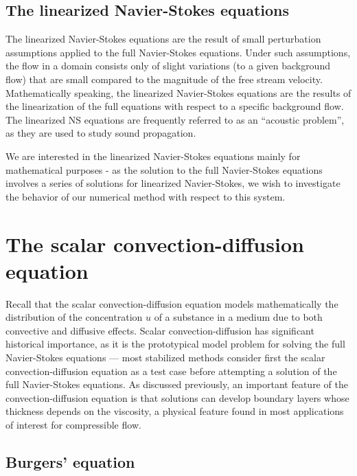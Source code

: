 \subsection{The linearized Navier-Stokes equations}

The linearized Navier-Stokes equations are the result of small perturbation assumptions applied to the full Navier-Stokes equations. Under such assumptions, the flow in a domain consists only of slight variations (to a given background flow) that are small compared to the magnitude of the free stream velocity.  Mathematically speaking, the linearized Navier-Stokes equations are the results of the linearization of the full equations with respect to a specific background flow.  The linearized NS equations are frequently referred to as an ``acoustic problem'', as they are used to study sound propagation.  

We are interested in the linearized Navier-Stokes equations mainly for mathematical purposes - as the solution to the full Navier-Stokes equations involves a series of solutions for linearized Navier-Stokes, we wish to investigate the behavior of our numerical method with respect to this system.  

\section{The scalar convection-diffusion equation}

Recall that the scalar convection-diffusion equation models mathematically the distribution of the concentration $u$ of a substance in a medium due to both convective and diffusive effects. 
Scalar convection-diffusion has significant historical importance, as it is the prototypical model problem for solving the full Navier-Stokes equations --- most stabilized methods consider first the scalar convection-diffusion equation as a test case before attempting a solution of the full Navier-Stokes equations. As discussed previously, an important feature of the convection-diffusion equation is that solutions can develop boundary layers whose thickness depends on the viscosity, a physical feature found in most applications of interest for compressible flow. 

\subsection{Burgers' equation}

